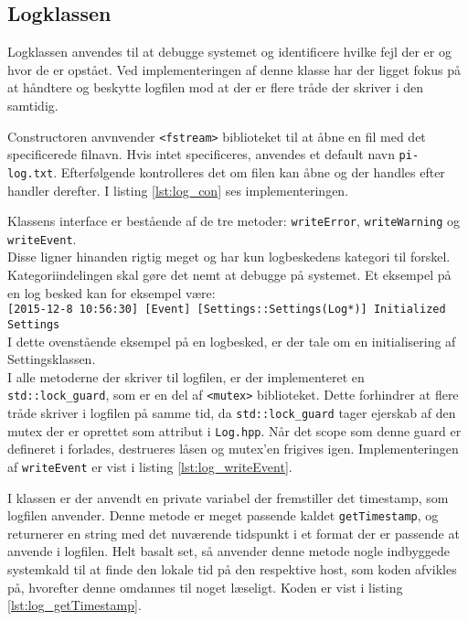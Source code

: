 \subsection{Logklassen}

Logklassen anvendes til at debugge systemet og identificere hvilke fejl der er og hvor de er opstået. Ved implementeringen af denne klasse har der ligget fokus på at håndtere og beskytte logfilen mod at der er flere tråde der skriver i den samtidig.

Constructoren anvnvender \texttt{<fstream>} biblioteket til at åbne en fil med det specificerede filnavn. Hvis intet specificeres, anvendes et default navn \texttt{pi-log.txt}. Efterfølgende kontrolleres det om filen kan åbne og der handles efter handler derefter. I listing \ref{lst:log_con} ses implementeringen.



Klassens interface er bestående af de tre metoder: \texttt{writeError}, \texttt{writeWarning} og \texttt{writeEvent}. \\
Disse ligner hinanden rigtig meget og har kun logbeskedens kategori til forskel. 
Kategoriindelingen skal gøre det nemt at debugge på systemet. Et eksempel på en log besked kan for eksempel være:\\

\texttt{[2015-12-8 10:56:30] [Event] [Settings::Settings(Log*)] Initialized Settings}\\

I dette ovenstående eksempel på en logbesked, er der tale om en initialisering af Settingsklassen.\\
I alle metoderne der skriver til logfilen, er der implementeret en \texttt{std::lock\_guard}, som er en del af \texttt{<mutex>} biblioteket. 
Dette forhindrer at flere tråde skriver i logfilen på samme tid, da \texttt{std::lock\_guard} tager ejerskab af den mutex der er oprettet som attribut i \texttt{Log.hpp}. 
Når det scope som denne guard er defineret i forlades, destrueres låsen og mutex'en frigives igen. Implementeringen af \texttt{writeEvent} er vist i listing \ref{lst:log_writeEvent}.



I klassen er der anvendt en private variabel der fremstiller det timestamp, som logfilen anvender. Denne metode er meget passende kaldet \texttt{getTimestamp}, og returnerer en string med det nuværende tidspunkt i et format der er passende at anvende i logfilen. Helt basalt set, så anvender denne metode nogle indbyggede systemkald til at finde den lokale tid på den respektive host, som koden afvikles på, hvorefter denne omdannes til noget læseligt. Koden er vist i listing \ref{lst:log_getTimestamp}.

